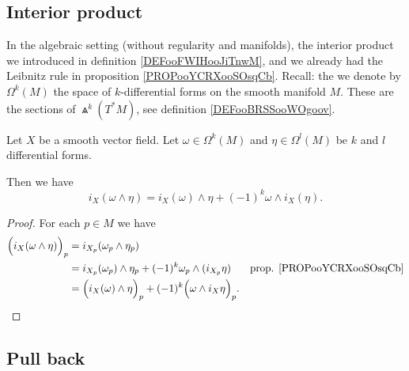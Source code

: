 \subsection{Interior product}

In the algebraic setting (without regularity and manifolds), the interior product we introduced in definition \ref{DEFooFWIHooJiTnwM}, and we already had the Leibnitz rule in proposition \ref{PROPooYCRXooSOsqCb}. Recall: the we denote by \( \Omega^k(M)\) the space of \( k\)-differential forms on the smooth manifold \( M\). These are the sections of \( \Wedge^k(T^*M)\), see definition \ref{DEFooBRSSooWOgoov}.

\begin{proposition}		\label{PROPooIQIUooTDNJdB}
	Let \( X\) be a smooth vector field. Let \( \omega\in \Omega^k(M)\) and \( \eta\in \Omega^l(M)\) be \( k\) and \( l\) differential forms.

	Then we have
	\begin{equation}
		i_X(\omega\wedge \eta)=i_X(\omega)\wedge \eta+(-1)^k\omega\wedge i_X(\eta).
	\end{equation}
\end{proposition}

\begin{proof}
	For each \( p\in M\) we have
	\begin{subequations}
		\begin{align}
			\Big( i_X(\omega\wedge \eta) \Big)_p & = i_{X_p}(\omega_p\wedge \eta_p)                                                                                         \\
			                                     & = i_{X_p}(\omega_p)\wedge\eta_p+(-1)^k\omega_p\wedge(i_{X_p}\eta)                & \text{prop. \ref{PROPooYCRXooSOsqCb}} \\
			                                     & = \Big( i_X(\omega)\wedge \eta \Big)_p+(-1)^k\Big( \omega\wedge i_X\eta \Big)_p.
		\end{align}
	\end{subequations}
\end{proof}

\subsection{Pull back}


